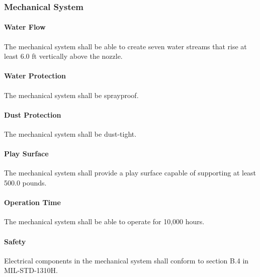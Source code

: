 \subsubsection{Mechanical System}

\paragraph{Water Flow}
The mechanical system shall be able to create seven water streams that rise at least 6.0 ft vertically above the nozzle.

\paragraph{Water Protection}
The mechanical system shall be sprayproof. %

\paragraph{Dust Protection}
The mechanical system shall be dust-tight. %


\paragraph{Play Surface}
The mechanical system shall provide a play surface capable of supporting at least 500.0 pounds.

\paragraph{Operation Time}
The mechanical system shall be able to operate for 10,000 hours. 

\paragraph{Safety}
Electrical components in the mechanical system shall conform to section B.4 in MIL-STD-1310H. 





